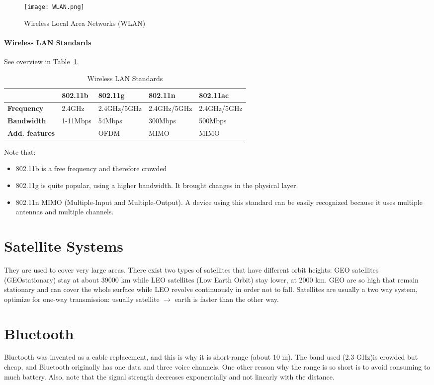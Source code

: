 \begin{figure}[t]
  \centering
  \texttt{[image: WLAN.png]}
  \caption{Wireless Local Area Networks (WLAN)}			
  
  \label{fig:cws:WLAN}
\end{figure}

\paragraph*{Wireless LAN Standards}
See overview in Table~\ref{tab:cws:WLANStd}.
\begin{table}[b]
\centering
\begin{tabular}{l|l|l|l|l|}
\cline{2-5}
&\textbf{802.11b}     & \textbf{802.11g}     & \textbf{802.11n}     & \textbf{802.11ac}    \\ \hline
\textbf{Frequency}    &2.4GHz   & 2.4GHz/5GHz & 2.4GHz/5GHz & 2.4GHz/5GHz \\ \hline
\textbf{Bandwidth}    &1-11Mbps & 54Mbps      & 300Mbps     & 500Mbps     \\ \hline
\textbf{Add. features}&         & OFDM        & MIMO        & MIMO        \\ \hline
\end{tabular}
\caption{Wireless LAN Standards}
\label{tab:cws:WLANStd}
\end{table}


Note that:
\begin{itemize}
\item 802.11b is a free frequency and therefore crowded
\item 802.11g is quite popular, using a higher bandwidth. It 
  brought changes in the physical layer.
\item 802.11n MIMO (Multiple-Input and Multiple-Output). A 
  device using this standard can be easily recognized because it uses multiple 
  antennas and multiple channels.
\end{itemize}

\section{Satellite Systems}
They are used to cover very large areas. There exist two types of 
satellites that have different orbit heights: GEO satellites (GEOstationary) 
stay at about 39000 km while LEO satellites (Low Earth Orbit) stay lower, at 
2000 km. GEO are so high that remain stationary and can cover the whole surface 
while LEO revolve continuously in order not to fall.
Satellites are usually a two way system, optimize for one-way 
transmission: usually satellite $\to$ earth is faster than the other way.

\section{Bluetooth}
Bluetooth was invented as a cable replacement, and this is why it is 
short-range (about 10 m). The band used (2.3 GHz)is crowded but cheap, and 
Bluetooth originally has one data and three voice channels.
One other reason why the range is so short is to avoid consuming to much 
battery. Also, note that the signal strength decreases exponentially and not 
linearly with the distance.


